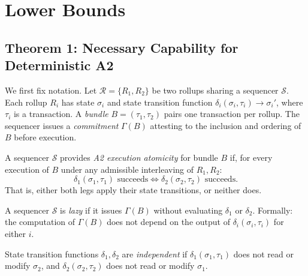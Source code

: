 %

\section{Lower Bounds}
\label{sec:bounds}

\subsection{Theorem 1: Necessary Capability for Deterministic A2}
\label{sec:thm1}

We first fix notation. Let $\mathcal{R} = \{R_1, R_2\}$ be two rollups sharing
a sequencer $\mathcal{S}$. Each rollup $R_i$ has state $\sigma_i$ and state
transition function $\delta_i(\sigma_i, \tau_i) \to \sigma_i'$, where $\tau_i$
is a transaction. A \emph{bundle} $B = (\tau_1, \tau_2)$ pairs one transaction
per rollup. The sequencer issues a \emph{commitment} $\Gamma(B)$ attesting to
the inclusion and ordering of $B$ before execution.

\begin{definition}
\label{def:a2}
A sequencer $\mathcal{S}$ provides \emph{A2 execution atomicity} for bundle $B$
if, for every execution of $B$ under any admissible interleaving of $R_1, R_2$:
\[
  \delta_1(\sigma_1, \tau_1) \text{ succeeds} \iff \delta_2(\sigma_2, \tau_2) \text{ succeeds.}
\]
That is, either both legs apply their state transitions, or neither does.
\end{definition}

\begin{definition}
\label{def:lazy}
A sequencer $\mathcal{S}$ is \emph{lazy} if it issues $\Gamma(B)$ without
evaluating $\delta_1$ or $\delta_2$. Formally: the computation of $\Gamma(B)$
does not depend on the output of $\delta_i(\sigma_i, \tau_i)$ for either $i$.
\end{definition}

\begin{definition}
\label{def:independent}
State transition functions $\delta_1, \delta_2$ are \emph{independent} if
$\delta_1(\sigma_1, \tau_1)$ does not read or modify $\sigma_2$, and
$\delta_2(\sigma_2, \tau_2)$ does not read or modify $\sigma_1$.
\end{definition}

